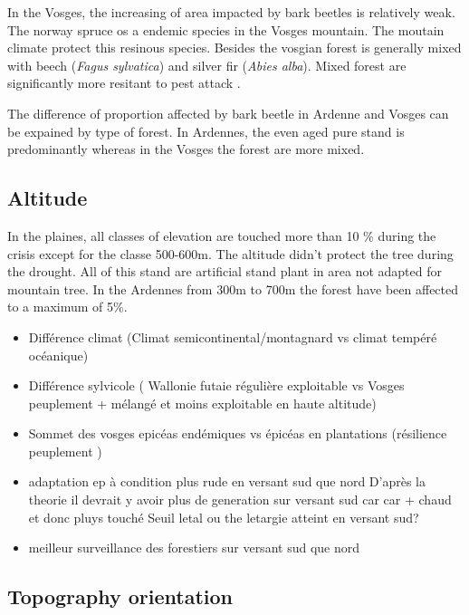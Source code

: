 \documentclass[3p,procedia]{elsarticle}
\begin{document}
In the Vosges, the increasing of area impacted by bark beetles is relatively weak.
The norway spruce os a endemic species in the Vosges mountain. 
The moutain climate protect this resinous species. 
Besides the vosgian forest is generally mixed with beech (\textit{Fagus sylvatica}) and  silver fir (\textit{Abies alba}). Mixed forest are significantly more resitant to pest attack \citep{jactel_2021}. 

The difference of proportion affected by bark beetle in Ardenne and Vosges can be expained by type of forest.
In Ardennes, the even aged pure stand is predominantly whereas in the Vosges  the forest are more mixed. 

\subsection{Altitude}


In the plaines, all classes of elevation are touched more than 10 \% during the crisis except for the classe 500-600m. 
The altitude didn't protect the tree during the drought. 
All of this stand are artificial stand plant in area not adapted for mountain tree. In the Ardennes from 300m to 700m the forest have been affected to a maximum of 5\%. 








\begin{itemize}
	\item Différence climat (Climat semicontinental/montagnard vs climat tempéré océanique)
	\item Différence sylvicole ( Wallonie futaie régulière exploitable vs Vosges peuplement + mélangé et moins exploitable en haute altitude)
	\item Sommet des vosges epicéas endémiques vs épicéas en plantations (résilience peuplement )
	\item adaptation ep à condition plus rude en versant sud que nord 
	D'après la theorie il devrait y avoir plus de generation sur versant sud car car + chaud et donc pluys touché
	Seuil letal ou the letargie atteint en versant sud?
\item meilleur surveillance des forestiers sur versant sud que nord 
	
\end{itemize}

\subsection{Topography orientation}
\end{document}
